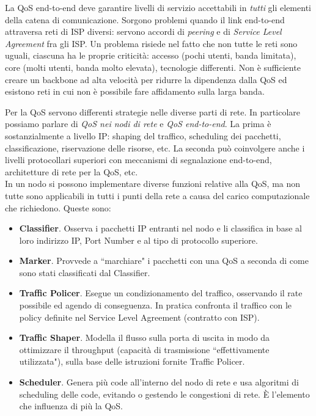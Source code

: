 La QoS end-to-end deve garantire livelli di servizio accettabili in \textit{tutti} gli elementi della catena di comunicazione. Sorgono problemi quando il link end-to-end attraversa reti di ISP diversi: servono accordi di \textit{peering} e di \textit{Service Level Agreement} fra gli ISP. Un problema risiede nel fatto che non tutte le reti sono uguali, ciascuna ha le proprie criticità: accesso (pochi utenti, banda limitata), core (molti utenti, banda molto elevata), tecnologie differenti. Non è sufficiente creare un backbone ad alta velocità per ridurre la dipendenza dalla QoS ed esistono reti in cui non è possibile fare affidamento sulla larga banda.

Per la QoS servono differenti strategie nelle diverse parti di rete. In particolare possiamo parlare di \textit{QoS nei nodi di rete} e \textit{QoS end-to-end}. La prima è sostanzialmente a livello IP: shaping del traffico, scheduling dei pacchetti, classificazione, riservazione delle risorse, etc. La seconda può coinvolgere anche i livelli protocollari superiori con meccanismi di segnalazione end-to-end, architetture di rete per la QoS, etc.\\
In un nodo si possono implementare diverse funzioni relative alla QoS, ma non tutte sono applicabili in tutti i punti della rete a causa del carico computazionale che richiedono. Queste sono:
\begin{itemize}
	\item \textbf{Classifier}. Osserva i pacchetti IP entranti nel nodo e li classifica in base al loro indirizzo IP, Port Number e al tipo di protocollo superiore.
	\item \textbf{Marker}. Provvede a \textquotedblleft marchiare" i pacchetti con una QoS a seconda di come sono stati classificati dal Classifier.
	\item \textbf{Traffic Policer}. Esegue un condizionamento del traffico, osservando il rate possibile ed agendo di conseguenza. In pratica confronta il traffico con le policy definite nel Service Level Agreement (contratto con ISP).
	\item \textbf{Traffic Shaper}. Modella il flusso sulla porta di uscita in modo da ottimizzare il throughput (capacità di trasmissione \textquotedblleft effettivamente utilizzata"), sulla base delle istruzioni fornite Traffic Policer.
	\item \textbf{Scheduler}. Genera più code all'interno del nodo di rete e usa algoritmi di scheduling delle code, evitando o gestendo le congestioni di rete. È l'elemento che influenza di più la QoS.
\end{itemize}
